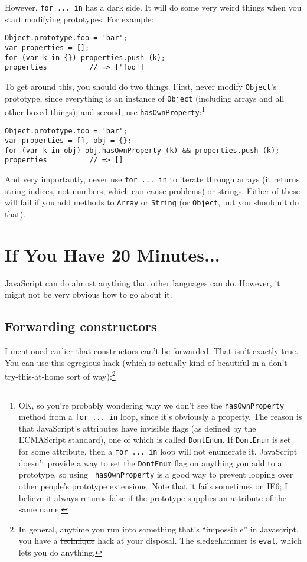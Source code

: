 \documentclass{article}
\begin{document}
  However, \verb|for ... in| has a dark side. It will do some very weird things when you start modifying prototypes. For example:

\begin{verbatim}
Object.prototype.foo = 'bar';
var properties = [];
for (var k in {}) properties.push (k);
properties          // => ['foo']
\end{verbatim}

  To get around this, you should do two things. First, never modify \verb|Object|'s prototype, since everything is an instance of \verb|Object| (including arrays and all other boxed things);
  and second, use \verb|hasOwnProperty|:\footnote{OK, so you're probably wondering why we don't see the {\tt hasOwnProperty} method from a {\tt for ... in} loop, since it's obviously a
  property. The reason is that JavaScript's attributes have invisible flags (as defined by the ECMAScript standard), one of which is called {\tt DontEnum}. If {\tt DontEnum} is set for some
  attribute, then a {\tt for ... in} loop will not enumerate it. JavaScript doesn't provide a way to set the {\tt DontEnum} flag on anything you add to a prototype, so using {\tt
  hasOwnProperty} is a good way to prevent looping over other people's prototype extensions. Note that it fails sometimes on IE6; I believe it always returns false if the prototype supplies an
  attribute of the same name.}

\begin{verbatim}
Object.prototype.foo = 'bar';
var properties = [], obj = {};
for (var k in obj) obj.hasOwnProperty (k) && properties.push (k);
properties          // => []
\end{verbatim}

  And very importantly, never use \verb|for ... in| to iterate through arrays (it returns string indices, not numbers, which can cause problems) or strings. Either of these will fail if you
  add methods to {\tt Array} or {\tt String} (or {\tt Object}, but you shouldn't do that).

\section {If You Have 20 Minutes...}
  JavaScript can do almost anything that other languages can do. However, it might not be very obvious how to go about it.

\subsection {Forwarding constructors}
    \label{sec:forwarding-constructors}
    I mentioned earlier that constructors can't be forwarded. That isn't exactly true. You can use this egregious hack (which is actually kind of beautiful in a don't-try-this-at-home sort of
    way):\footnote{In general, anytime you run into something that's ``impossible'' in Javascript, you have a \sout{technique} hack at your disposal. The sledgehammer is {\tt eval}, which lets
    you do anything.}
\end{document}
